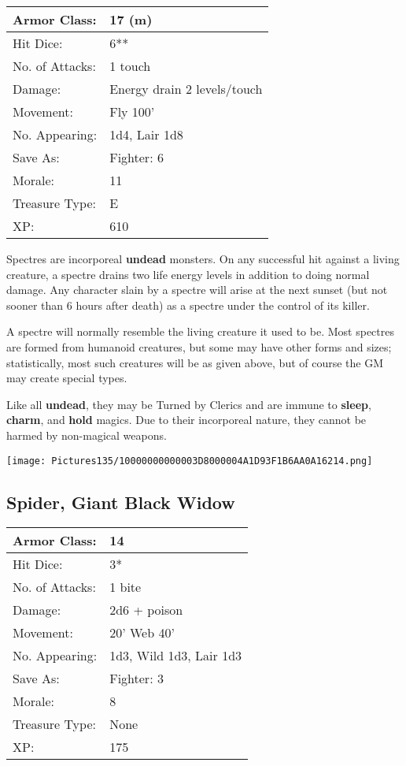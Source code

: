 \documentclass[a4paper,twoside,openany,10pt]{book}
\begin{document}
\begin{multicols}{2}
\begin{tabularx}{0.50\textwidth}{@{}lX@{}}
Armor Class: & 17 (m) \\\hline
Hit Dice: & 6** \\\hline
No. of Attacks: & 1 touch \\\hline
Damage: & Energy drain 2 levels/touch \\\hline
Movement: & Fly 100' \\\hline
No. Appearing: & 1d4, Lair 1d8 \\\hline
Save As: & Fighter: 6 \\\hline
Morale: & 11 \\\hline
Treasure Type: & E \\\hline
XP: & 610 \\\hline
\end{tabularx}\medskip

Spectres are incorporeal \textbf{undead} monsters. On any successful hit against a living creature, a spectre drains two life energy levels in addition to doing normal damage. Any character slain by a spectre will arise at the next sunset (but not sooner than 6 hours after death) as a spectre under the control of its killer.

A spectre will normally resemble the living creature it used to be. Most spectres are formed from humanoid creatures, but some may have other forms and sizes; statistically, most such creatures will be as given above, but of course the GM may create special types.

Like all \textbf{undead}, they may be Turned by Clerics and are immune to \textbf{sleep}, \textbf{charm},\textbf{ }and \textbf{hold} magics. Due to their incorporeal nature, they cannot be harmed by non-magical weapons.

\begin{center} \texttt{[image: Pictures135/10000000000003D8000004A1D93F1B6AA0A16214.png]} \end{center}


\subsection*{Spider, Giant Black Widow}\label{spider-giant-black-widow}

\begin{tabularx}{0.50\textwidth}{@{}lX@{}}
Armor Class: & 14 \\\hline
Hit Dice: & 3* \\\hline
No. of Attacks: & 1 bite \\\hline
Damage: & 2d6 + poison \\\hline
Movement: & 20' Web 40' \\\hline
No. Appearing: & 1d3, Wild 1d3, Lair 1d3 \\\hline
Save As: & Fighter: 3 \\\hline
Morale: & 8 \\\hline
Treasure Type: & None \\\hline
XP: & 175 \\\hline
\end{tabularx}\medskip


\end{multicols}
\end{document}
